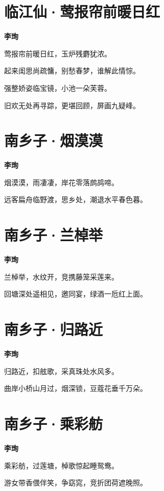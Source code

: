 \documentclass[12pt,a4paper]{ctexbook}
\begin{document}
\section{临江仙·莺报帘前暖日红}
\textbf{李珣}\par\vspace{0.5em}
莺报帘前暖日红，玉炉残麝犹浓。\par
起来闺思尚疏慵，别愁春梦，谁解此情悰。\par
强整娇姿临宝镜，小池一朵芙蓉。\par
旧欢无处再寻踪，更堪回顾，屏画九疑峰。\par

\section{南乡子·烟漠漠}
\textbf{李珣}\par\vspace{0.5em}
烟漠漠，雨凄凄，岸花零落鹧鸪啼。\par
远客扁舟临野渡，思乡处，潮退水平春色暮。\par

\section{南乡子·兰棹举}
\textbf{李珣}\par\vspace{0.5em}
兰棹举，水纹开，竞携藤笼采莲来。\par
回塘深处遥相见，邀同宴，绿酒一卮红上面。\par

\section{南乡子·归路近}
\textbf{李珣}\par\vspace{0.5em}
归路近，扣舷歌，采真珠处水风多。\par
曲岸小桥山月过，烟深锁，豆蔻花垂千万朵。\par

\section{南乡子·乘彩舫}
\textbf{李珣}\par\vspace{0.5em}
乘彩舫，过莲塘，棹歌惊起睡鸳鸯。\par
游女带香偎伴笑，争窈窕，竞折团荷遮晚照。\par
\end{document}
